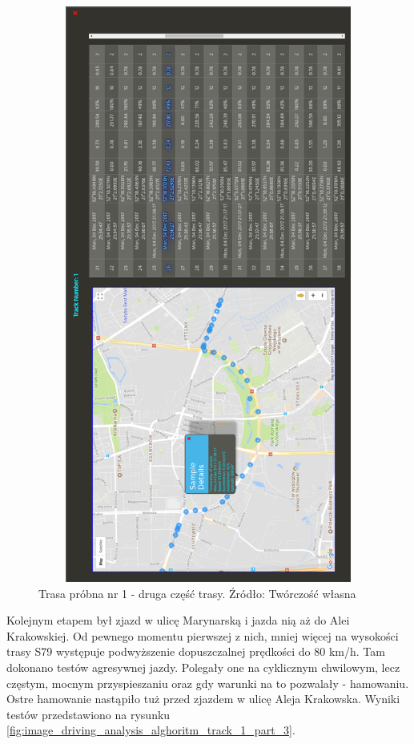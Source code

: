 \begin{figure}[H]
	\centering
	\includegraphics[height=19cm, width=13cm]{img/driving_analysis/test_track_part_2.png}
	\caption{Trasa próbna nr 1 - druga część trasy. Źródło: Twórczość własna}
	\label{fig:image_driving_analysis_alghoritm_track_1_part_2}
\end{figure}

Kolejnym etapem był zjazd w ulicę Marynarską i jazda nią aż do Alei Krakowskiej. Od pewnego momentu pierwszej z nich, mniej więcej na wysokości trasy S79 występuje podwyższenie dopuszczalnej prędkości do 80 km/h. Tam dokonano testów agresywnej jazdy. Polegały one na cyklicznym chwilowym, lecz częstym, mocnym przyspieszaniu oraz gdy warunki na to pozwalały - hamowaniu. Ostre hamowanie nastąpiło tuż przed zjazdem w ulicę Aleja Krakowska. Wyniki testów przedstawiono na rysunku \ref{fig:image_driving_analysis_alghoritm_track_1_part_3}.

